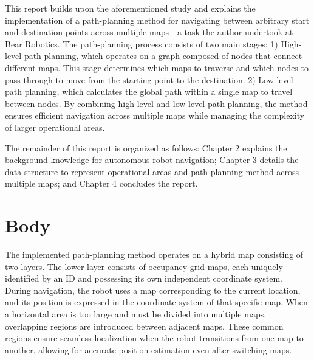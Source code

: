 \documentclass[en]{snu-cse-bsc-thesis}
\begin{document}
This report builds upon the aforementioned study and explains the implementation of a path-planning method for navigating between arbitrary start and destination points across multiple maps—a task the author undertook at Bear Robotics. The path-planning process consists of two main stages: 1) High-level path planning, which operates on a graph composed of nodes that connect different maps. This stage determines which maps to traverse and which nodes to pass through to move from the starting point to the destination. 2) Low-level path planning, which calculates the global path within a single map to travel between nodes. By combining high-level and low-level path planning, the method ensures efficient navigation across multiple maps while managing the complexity of larger operational areas.

The remainder of this report is organized as follows:
Chapter 2 explains the background knowledge for autonomous robot navigation; Chapter 3 details the data structure to represent operational areas and path planning method across multiple maps; and Chapter 4 concludes the report.




\chapter{Body}\label{chap:body}
The implemented path-planning method operates on a hybrid map consisting of two layers. The lower layer consists of occupancy grid maps, each uniquely identified by an ID and possessing its own independent coordinate system. During navigation, the robot uses a map corresponding to the current location, and its position is expressed in the coordinate system of that specific map. When a horizontal area is too large and must be divided into multiple maps, overlapping regions are introduced between adjacent maps. These common regions ensure seamless localization when the robot transitions from one map to another, allowing for accurate position estimation even after switching maps.
\end{document}
